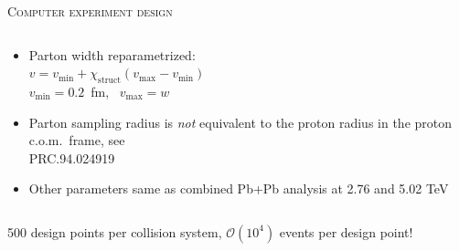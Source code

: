 \documentclass[aspectratio=169]{beamer}
\newcommand{\X}{\chi_\text{struct}}
\begin{document}
\begin{frame}[t]{\scshape Computer experiment design}
\begin{columns}[T]
\begin{column}{.4\textwidth}
\begin{itemize}
        \small
        \item Parton width reparametrized:\\[1ex]
          $v = v_\text{min} + \X(v_\text{max} - v_\text{min})$\\[1ex]
          $v_\text{min} = 0.2$~fm,~ $v_\text{max} = w$\\[1ex]
        \item Parton sampling radius is \emph{not} equivalent to the proton radius
          in the proton c.o.m.\ frame, see\\
          \textcolor{theme}{\scriptsize PRC.94.024919}\\[1ex]
        \item Other parameters same as combined Pb+Pb analysis at 2.76 and 5.02 TeV
      \end{itemize}
    \end{column}
  \end{columns}
  \begin{center}
    \color{theme}
    500 design points per collision system, $\mathcal{O}(10^4)$ events per design point!
  \end{center}
\end{frame}

\begin{frame}[plain]
\end{frame}
\end{document}
